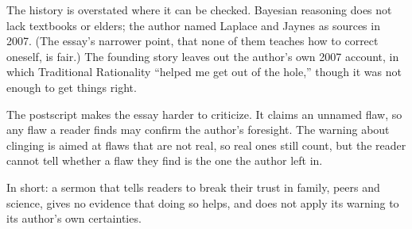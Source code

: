 \begin{afterword}
The history is overstated where it can be checked. Bayesian reasoning does not lack textbooks or elders; the author named Laplace and Jaynes as sources in 2007. (The essay's narrower point, that none of them teaches how to correct oneself, is fair.) The founding story leaves out the author's own 2007 account, in which Traditional Rationality ``helped me get out of the hole,'' though it was not enough to get things right.

The postscript makes the essay harder to criticize. It claims an unnamed flaw, so any flaw a reader finds may confirm the author's foresight. The warning about clinging is aimed at flaws that are not real, so real ones still count, but the reader cannot tell whether a flaw they find is the one the author left in.

In short: a sermon that tells readers to break their trust in family, peers and science, gives no evidence that doing so helps, and does not apply its warning to its author's own certainties.
\end{afterword}

